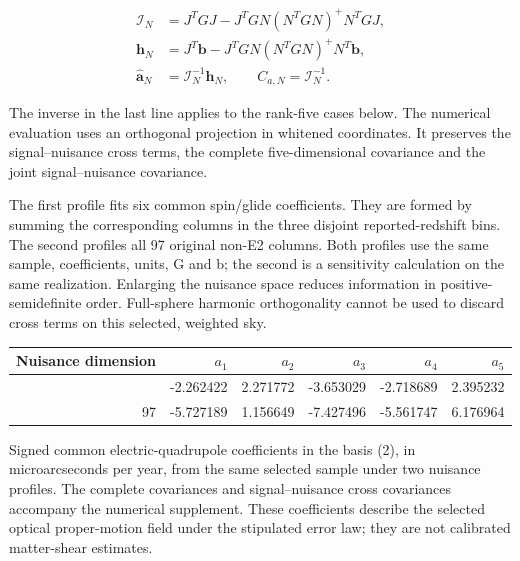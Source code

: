 \documentclass[aps,prd,preprint,onecolumn,notitlepage]{revtex4-2}
\begin{document}
\[
\begin{aligned}
\mathcal I_N&=J^TGJ-J^TGN(N^TGN)^+N^TGJ,\\
\boldsymbol h_N&=J^T\boldsymbol b
-J^TGN(N^TGN)^+N^T\boldsymbol b,\\
\widehat{\boldsymbol a}_N&=\mathcal I_N^{-1}\boldsymbol h_N,
\qquad C_{a,N}=\mathcal I_N^{-1}.
\end{aligned}
\tag{34}
\]

The inverse in the last line applies to the rank-five cases below. The numerical evaluation uses an orthogonal projection in whitened coordinates. It preserves the signal--nuisance cross terms, the complete five-dimensional covariance and the joint signal--nuisance covariance.

The first profile fits six common spin/glide coefficients. They are formed by summing the corresponding columns in the three disjoint reported-redshift bins. The second profiles all 97 original non-E2 columns. Both profiles use the same sample, coefficients, units, G and b; the second is a sensitivity calculation on the same realization. Enlarging the nuisance space reduces information in positive-semidefinite order. Full-sphere harmonic orthogonality cannot be used to discard cross terms on this selected, weighted sky.

\begin{longtable}[]{@{}rrrrrr@{}}
\toprule\noalign{}
Nuisance dimension & \(a_1\) & \(a_2\) & \(a_3\) & \(a_4\) & \(a_5\) \\
\midrule\noalign{}
\endhead
\bottomrule\noalign{}
\endlastfoot
6 & -2.262422 & 2.271772 & -3.653029 & -2.718689 & 2.395232 \\
97 & -5.727189 & 1.156649 & -7.427496 & -5.561747 & 6.176964 \\
\end{longtable}

Signed common electric-quadrupole coefficients in the basis (2), in microarcseconds per year, from the same selected sample under two nuisance profiles. The complete covariances and signal--nuisance cross covariances accompany the numerical supplement. These coefficients describe the selected optical proper-motion field under the stipulated error law; they are not calibrated matter-shear estimates.
\end{document}
